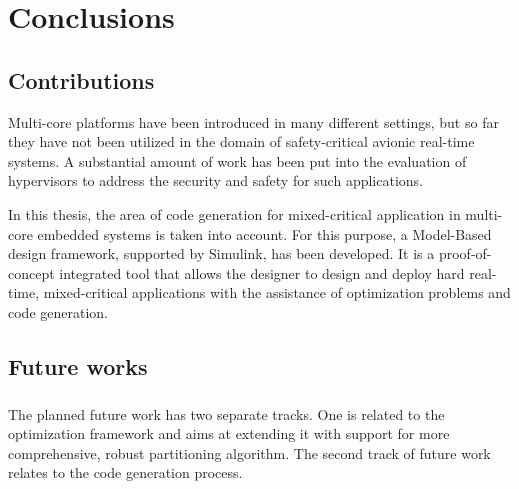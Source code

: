 
\chapter{Conclusions}

\ifpdf
    \graphicspath{{Chapters/Figs/Raster/}{Chapters/Figs/PDF/}{Chapters/Figs/}}
\else
    \graphicspath{{Chapters/Figs/Vector/}{Chapters/Figs/}}
\fi


\section{Contributions}

Multi-core platforms have been introduced in many different settings, but so far they have not been utilized in the domain of safety-critical avionic real-time systems. A substantial amount of work has been put into the evaluation of hypervisors to address the security and safety for such applications.
\par In this thesis, the area of code generation for mixed-critical application in multi-core embedded systems is taken into account. For this purpose, a Model-Based design framework, supported by Simulink, has been developed. It is a proof-of-concept integrated tool that allows the designer to design and deploy hard real-time, mixed-critical applications with the assistance of optimization problems and code generation.

\section{Future works}

\paragraph{} The planned future work has two separate tracks. One is related to the optimization framework and aims at extending it with support for more comprehensive, robust partitioning algorithm. The second track of future work relates to the code generation process.

